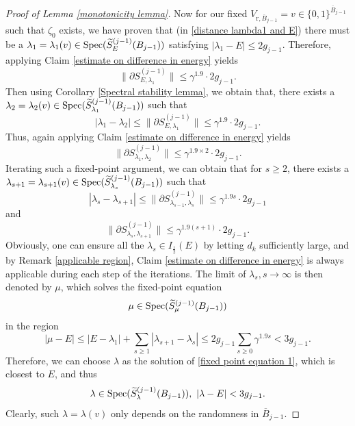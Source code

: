 \documentclass[11pt,reqno,UTF8,twoside]{amsart}
\newcommand{\spec}{{\rm Spec}}
\newcommand{\barB}{\overline{B}}
\newcommand{\wtSjminusone}{\widetilde{S}^{(j-1)}}
\newcommand{\partialSjminusone}{\partial {S}^{(j-1)}}
\theoremstyle{definition}
\numberwithin{equation}{section}
\begin{document}
\begin{proof}[Proof of Lemma \ref{monotonicity lemma}]
Now for our fixed $V_{\text{r},\barB_{j-1}}=v\in\{0,1\}^{\barB_{j-1}} $ such that $\zeta_0$ exists, we have proven  that (in \eqref{distance lambda1 and E}) there must be a $\lambda_1=\lambda_1(v)\in \spec(\wtSjminusone_E(B_{j-1}))$ satisfying $|\lambda_1-E|\leq 2g_{j-1}$. Therefore, applying Claim \ref{estimate on difference in energy} yields 
\[\|\partialSjminusone_{E,\lambda_1} \|\leq \gamma^{1.9} \cdot 2g_{j-1}.\]
Then using  Corollary \ref{Spectral stability lemma},   we obtain that, there exists a $\lambda_2=\lambda_2(v)\in \spec(\wtSjminusone_{\lambda_1}(B_{j-1}))$ such that 
\[|\lambda_1-\lambda_2|\leq \|\partialSjminusone_{E,\lambda_1} \| \leq \gamma^{1.9} \cdot 2g_{j-1}. \]
Thus, again applying Claim \ref{estimate on difference in energy} yields 
\[\|\partialSjminusone_{\lambda_1,\lambda_2} \|\leq \gamma^{1.9\times 2} \cdot 2g_{j-1}.\]
Iterating  such a  fixed-point argument, we can obtain that  for $s\geq 2$, there exists  a $\lambda_{s+1}=\lambda_{s+1}(v)\in \spec(\wtSjminusone_{\lambda_s}(B_{j-1}))$ such that 
\[|\lambda_s-\lambda_{s+1}|\leq \|\partialSjminusone_{\lambda_{s-1},\lambda_s} \| \leq \gamma^{1.9s} \cdot 2g_{j-1}\]
and 
\[\|\partialSjminusone_{\lambda_{s},\lambda_{s+1}} \|\leq \gamma^{1.9(s+1)} \cdot 2g_{j-1}.\]
Obviously,  one can ensure all the $\lambda_s\in I_{\frac{\iota}{2}}(E)$ by letting $d_k$ sufficiently large, and by Remark \ref{applicable region}, Claim \ref{estimate on difference in energy} is always applicable during each step of the iterations. The limit  of $\lambda_s,s\rightarrow\infty$ is then denoted by $\mu$, which solves the fixed-point equation 
\begin{equation}\label{fixed point equation 1}
  \mu\in \spec(\wtSjminusone_{\mu}(B_{j-1}))
\end{equation}
in the region 
\[|\mu-E|\leq |E-\lambda_1|+\sum_{s\geq 1}|\lambda_{s+1}-\lambda_s| \leq 2g_{j-1} \sum_{s\geq 0}\gamma^{1.9 s} < 3g_{j-1}. \]
Therefore, we can choose $\lambda$ as the solution of \eqref{fixed point equation 1},  which is closest to $E$, and thus 
\begin{equation}\label{distance of lambda and E}
  \lambda \in \spec(\wtSjminusone_{\lambda}(B_{j-1})),\ |\lambda-E|<3g_{j-1}.
\end{equation}
Clearly, such $\lambda=\lambda(v)$ only depends on the randomness in $\barB_{j-1}$. 






\end{proof}
\end{document}
